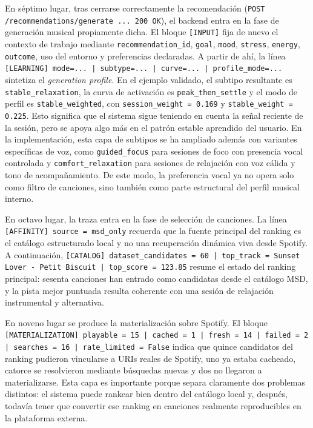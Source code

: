 En séptimo lugar, tras cerrarse correctamente la recomendación
(\texttt{POST /recommendations/generate ... 200 OK}), el backend entra en la
fase de generación musical propiamente dicha. El bloque \texttt{[INPUT]} fija
de nuevo el contexto de trabajo mediante \texttt{recommendation\_id},
\texttt{goal}, \texttt{mood}, \texttt{stress}, \texttt{energy},
\texttt{outcome}, uso del entorno y preferencias declaradas. A partir de ahí,
la línea \texttt{[LEARNING] mode=... | subtype=... | curve=... |
profile\_mode=...} sintetiza el \textit{generation profile}. En el ejemplo
validado, el subtipo resultante es \texttt{stable\_relaxation}, la curva de
activación es \texttt{peak\_then\_settle} y el modo de perfil es
\texttt{stable\_weighted}, con \texttt{session\_weight = 0.169} y
\texttt{stable\_weight = 0.225}. Esto significa que el sistema sigue teniendo
en cuenta la señal reciente de la sesión, pero se apoya algo más en el patrón
estable aprendido del usuario. En la implementación, esta capa de
subtipos se ha ampliado además con variantes específicas de voz, como
\texttt{guided\_focus} para sesiones de foco con presencia vocal controlada y
\texttt{comfort\_relaxation} para sesiones de relajación con voz cálida y tono
de acompañamiento. De este modo, la preferencia vocal ya no opera solo como
filtro de canciones, sino también como parte estructural del perfil musical
interno.

En octavo lugar, la traza entra en la fase de selección de canciones. La línea
\texttt{[AFFINITY] source = msd\_only} recuerda que la
fuente principal del ranking es el catálogo estructurado local y no una
recuperación dinámica viva desde Spotify. A continuación,
\texttt{[CATALOG] dataset\_candidates = 60 | top\_track = Sunset Lover - Petit
Biscuit | top\_score = 123.85} resume el estado del ranking principal: sesenta
canciones han entrado como candidatas desde el catálogo MSD, y la pista mejor
puntuada resulta coherente con una sesión de relajación instrumental y
alternativa.

En noveno lugar se produce la materialización sobre Spotify. El bloque
\texttt{[MATERIALIZATION] playable = 15 | cached = 1 | fresh = 14 |
failed = 2 | searches = 16 | rate\_limited = False} indica que quince
candidatos del ranking pudieron vincularse a URIs reales de Spotify, uno ya
estaba cacheado, catorce se resolvieron mediante búsquedas nuevas y dos no
llegaron a materializarse. Esta capa es importante porque separa claramente dos
problemas distintos: el sistema puede rankear bien dentro del catálogo local y,
después, todavía tener que convertir ese ranking en canciones realmente
reproducibles en la plataforma externa.


